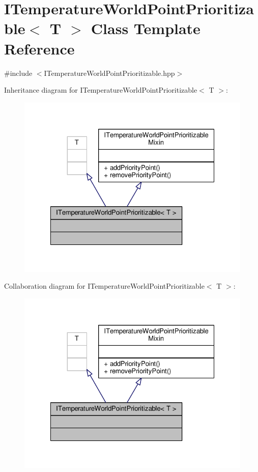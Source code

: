 \hypertarget{class_i_temperature_world_point_prioritizable}{\section{I\-Temperature\-World\-Point\-Prioritizable$<$ T $>$ Class Template Reference}
\label{class_i_temperature_world_point_prioritizable}
}


{\ttfamily \#include $<$I\-Temperature\-World\-Point\-Prioritizable.\-hpp$>$}



Inheritance diagram for I\-Temperature\-World\-Point\-Prioritizable$<$ T $>$\-:
\nopagebreak
\begin{figure}[H]
\begin{center}
\leavevmode
\includegraphics[width=324pt]{class_i_temperature_world_point_prioritizable__inherit__graph}
\end{center}
\end{figure}


Collaboration diagram for I\-Temperature\-World\-Point\-Prioritizable$<$ T $>$\-:
\nopagebreak
\begin{figure}[H]
\begin{center}
\leavevmode
\includegraphics[width=324pt]{class_i_temperature_world_point_prioritizable__coll__graph}
\end{center}
\end{figure}
